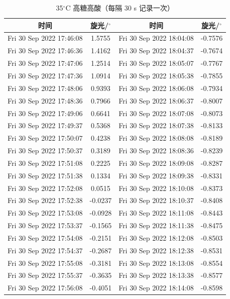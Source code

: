 \documentclass[12pt]{ctexart}
\numberwithin{equation}{section}
\begin{document}
\begin{longtable}{cc|cc}
    \caption{35$^\circ$C 高糖高酸（每隔 30 s 记录一次）} \\
    \hline
    时间 & 旋光/$^\circ$ & 时间 & 旋光/$^\circ$ \\
    \hline
    Fri 30 Sep 2022 17:46:08 & 1.5755 & Fri 30 Sep 2022 18:04:08 & -0.7576\\
Fri 30 Sep 2022 17:46:36 & 1.4162 & Fri 30 Sep 2022 18:04:37 & -0.7674\\
Fri 30 Sep 2022 17:47:06 & 1.2514 & Fri 30 Sep 2022 18:05:07 & -0.7767\\
Fri 30 Sep 2022 17:47:36 & 1.0914 & Fri 30 Sep 2022 18:05:38 & -0.7855\\
Fri 30 Sep 2022 17:48:06 & 0.9393 & Fri 30 Sep 2022 18:06:08 & -0.7934\\
Fri 30 Sep 2022 17:48:36 & 0.7966 & Fri 30 Sep 2022 18:06:37 & -0.8007\\
Fri 30 Sep 2022 17:49:06 & 0.6641 & Fri 30 Sep 2022 18:07:08 & -0.8073\\
Fri 30 Sep 2022 17:49:37 & 0.5368 & Fri 30 Sep 2022 18:07:38 & -0.8133\\
Fri 30 Sep 2022 17:50:07 & 0.4238 & Fri 30 Sep 2022 18:08:08 & -0.8189\\
Fri 30 Sep 2022 17:50:37 & 0.3189 & Fri 30 Sep 2022 18:08:36 & -0.8239\\
Fri 30 Sep 2022 17:51:08 & 0.2225 & Fri 30 Sep 2022 18:09:08 & -0.8287\\
Fri 30 Sep 2022 17:51:38 & 0.1334 & Fri 30 Sep 2022 18:09:38 & -0.8331\\
Fri 30 Sep 2022 17:52:08 & 0.0515 & Fri 30 Sep 2022 18:10:08 & -0.8373\\
Fri 30 Sep 2022 17:52:38 & -0.0237 & Fri 30 Sep 2022 18:10:37 & -0.8408\\
Fri 30 Sep 2022 17:53:08 & -0.0928 & Fri 30 Sep 2022 18:11:08 & -0.8443\\
Fri 30 Sep 2022 17:53:37 & -0.1565 & Fri 30 Sep 2022 18:11:38 & -0.8475\\
Fri 30 Sep 2022 17:54:08 & -0.2151 & Fri 30 Sep 2022 18:12:08 & -0.8503\\
Fri 30 Sep 2022 17:54:37 & -0.2687 & Fri 30 Sep 2022 18:12:38 & -0.8531\\
Fri 30 Sep 2022 17:55:08 & -0.3181 & Fri 30 Sep 2022 18:13:08 & -0.8554\\
Fri 30 Sep 2022 17:55:37 & -0.3635 & Fri 30 Sep 2022 18:13:38 & -0.8577\\
Fri 30 Sep 2022 17:56:08 & -0.4051 & Fri 30 Sep 2022 18:14:08 & -0.8598\\

\end{longtable}
\end{document}
